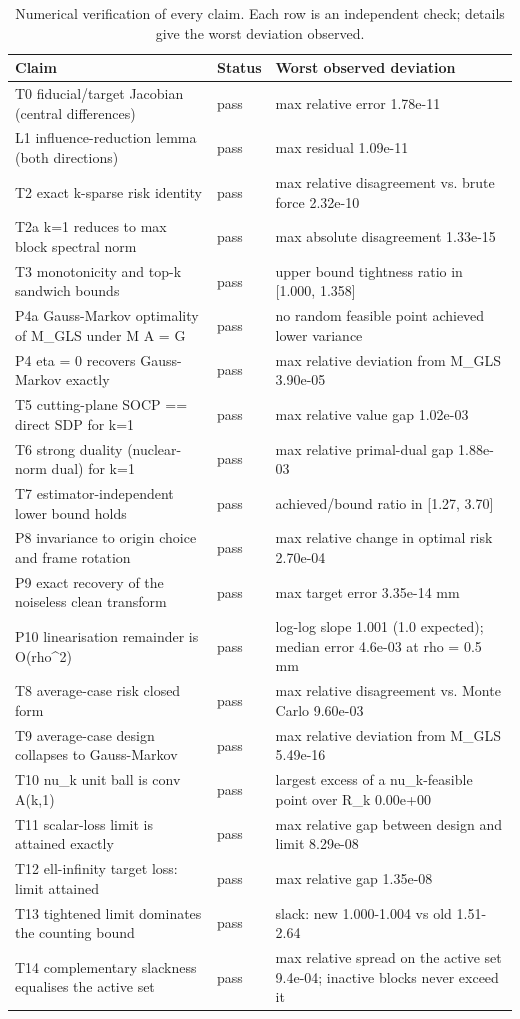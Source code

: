 \begin{table}[h]
\centering\small
\caption{Numerical verification of every claim. Each row is an independent check; details give the worst deviation observed.}
\label{tab:verification}
\begin{tabular}{@{}p{} l p{}@{}}
\toprule
Claim & Status & Worst observed deviation \\
\midrule
T0 fiducial/target Jacobian (central differences) & pass & max relative error 1.78e-11 \\
L1 influence-reduction lemma (both directions) & pass & max residual 1.09e-11 \\
T2 exact k-sparse risk identity & pass & max relative disagreement vs. brute force 2.32e-10 \\
T2a k=1 reduces to max block spectral norm & pass & max absolute disagreement 1.33e-15 \\
T3 monotonicity and top-k sandwich bounds & pass & upper bound tightness ratio in [1.000, 1.358] \\
P4a Gauss-Markov optimality of M\_GLS under M A = G & pass & no random feasible point achieved lower variance \\
P4 eta = 0 recovers Gauss-Markov exactly & pass & max relative deviation from M\_GLS 3.90e-05 \\
T5 cutting-plane SOCP == direct SDP for k=1 & pass & max relative value gap 1.02e-03 \\
T6 strong duality (nuclear-norm dual) for k=1 & pass & max relative primal-dual gap 1.88e-03 \\
T7 estimator-independent lower bound holds & pass & achieved/bound ratio in [1.27, 3.70] \\
P8 invariance to origin choice and frame rotation & pass & max relative change in optimal risk 2.70e-04 \\
P9 exact recovery of the noiseless clean transform & pass & max target error 3.35e-14 mm \\
P10 linearisation remainder is O(rho\textasciicircum{}2) & pass & log-log slope 1.001 (1.0 expected); median error 4.6e-03 at rho = 0.5 mm \\
T8 average-case risk closed form & pass & max relative disagreement vs. Monte Carlo 9.60e-03 \\
T9 average-case design collapses to Gauss-Markov & pass & max relative deviation from M\_GLS 5.49e-16 \\
T10 nu\_k unit ball is conv A(k,1) & pass & largest excess of a nu\_k-feasible point over R\_k 0.00e+00 \\
T11 scalar-loss limit is attained exactly & pass & max relative gap between design and limit 8.29e-08 \\
T12 ell-infinity target loss: limit attained & pass & max relative gap 1.35e-08 \\
T13 tightened limit dominates the counting bound & pass & slack: new 1.000-1.004 vs old 1.51-2.64 \\
T14 complementary slackness equalises the active set & pass & max relative spread on the active set 9.4e-04; inactive blocks never exceed it \\
\bottomrule
\end{tabular}
\end{table}
